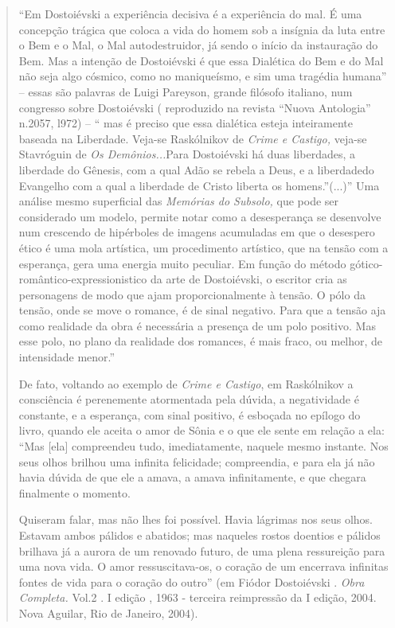 \begin{quote}
``Em Dostoiévski a experiência decisiva é a experiência do mal. É uma
concepção trágica que coloca a vida do homem sob a insígnia da luta
entre o Bem e o Mal, o Mal autodestruidor, já sendo o início da
instauração do Bem. Mas a intenção de Dostoiévski é que essa Dialética
do Bem e do Mal não seja algo cósmico, como no maniqueísmo, e sim uma
tragédia humana'' -- essas são palavras de Luigi Pareyson, grande
filósofo italiano, num congresso sobre Dostoiévski ( reproduzido na
revista ``Nuova Antologia'' n.2057, l972) -- `` mas é preciso que essa
dialética esteja inteiramente baseada na Liberdade. Veja-se Raskólnikov
de \emph{Crime e Castigo,} veja-se Stavróguin de \emph{Os
Demônios...}Para Dostoiévski há duas liberdades, a liberdade do Gênesis,
com a qual Adão se rebela a Deus, e a liberdadedo Evangelho com a qual a
liberdade de Cristo liberta os homens.''(...)'' Uma análise mesmo
superficial das \emph{Memórias do Subsolo,} que pode ser considerado um
modelo, permite notar como a desesperança se desenvolve num crescendo de
hipérboles de imagens acumuladas em que o desespero ético é uma mola
artística, um procedimento artístico, que na tensão com a esperança,
gera uma energia muito peculiar. Em função do método
gótico-romântico-expressionistico da arte de Dostoiévski, o escritor
cria as personagens de modo que ajam proporcionalmente à tensão. O pólo
da tensão, onde se move o romance, é de sinal negativo. Para que a
tensão aja como realidade da obra é necessária a presença de um polo
positivo. Mas esse polo, no plano da realidade dos romances, é mais
fraco, ou melhor, de intensidade menor.''

De fato, voltando ao exemplo de \emph{Crime e Castigo}, em Raskólnikov a
consciência é perenemente atormentada pela dúvida, a negatividade é
constante, e a esperança, com sinal positivo, é esboçada no epílogo do
livro, quando ele aceita o amor de Sônia e o que ele sente em relação a
ela: ``Mas {[}ela{]} compreendeu tudo, imediatamente, naquele mesmo
instante. Nos seus olhos brilhou uma infinita felicidade; compreendia, e
para ela já não havia dúvida de que ele a amava, a amava infinitamente,
e que chegara finalmente o momento.

Quiseram falar, mas não lhes foi possível. Havia lágrimas nos seus
olhos. Estavam ambos pálidos e abatidos; mas naqueles rostos doentios e
pálidos brilhava já a aurora de um renovado futuro, de uma plena
ressureição para uma nova vida. O amor ressuscitava-os, o coração de um
encerrava infinitas fontes de vida para o coração do outro'' (em Fiódor
Dostoiévski . \emph{Obra Completa.} Vol.2 . I edição , 1963 - terceira
reimpressão da I edição, 2004. Nova Aguilar, Rio de Janeiro, 2004).


\end{quote}
